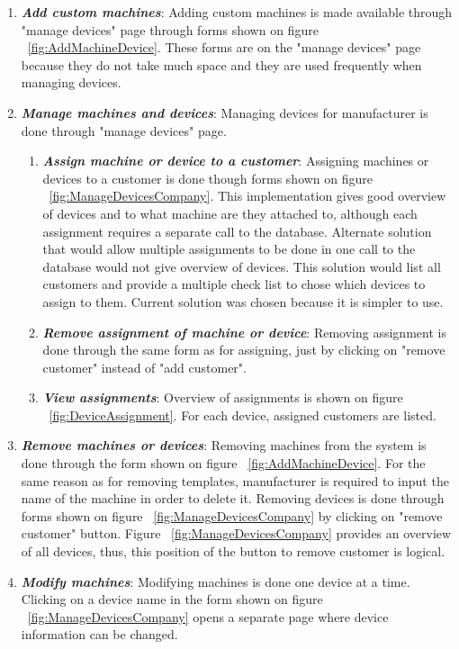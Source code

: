 \begin{enumerate}
	\item \textbf{\textit{Add custom machines}}: Adding custom machines is made available through "manage devices" page through forms shown on figure ~\ref{fig:AddMachineDevice}. These forms are on the "manage devices" page because they do not take much space and they are used frequently when managing devices.

	
	\item \textbf{\textit{Manage machines and devices}}: Managing devices for manufacturer is done through "manage devices" page.
		\begin{enumerate}
			\item \textbf{\textit{Assign machine or device to a customer}}: Assigning machines or devices to a customer is done though forms shown on figure ~\ref{fig:ManageDevicesCompany}. This implementation gives good overview of devices and to what machine are they attached to, although each assignment requires a separate call to the database. Alternate solution that would allow multiple assignments to be done in one call to the database would not give overview of devices. This solution would list all customers and provide a multiple check list to chose which devices to assign to them. Current solution was chosen because it is simpler to use.

			\item \textbf{\textit{Remove assignment of machine or device}}: Removing assignment is done through the same form as for assigning, just by clicking on "remove customer" instead of "add customer".

			\item \textbf{\textit{View assignments}}: Overview of assignments is shown on figure ~\ref{fig:DeviceAssignment}. For each device, assigned customers are listed.
		\end{enumerate}

	\item \textbf{\textit{Remove machines or devices}}: Removing machines from the system is done through the form shown on figure ~\ref{fig:AddMachineDevice}. For the same reason as for removing templates, manufacturer is required to input the name of the machine in order to delete it. Removing devices is done through forms shown on figure ~\ref{fig:ManageDevicesCompany} by clicking on "remove customer" button. Figure ~\ref{fig:ManageDevicesCompany} provides an overview of all devices, thus, this position of the button to remove customer is logical.

	\item \textbf{\textit{Modify machines}}: Modifying machines is done one device at a time. Clicking on a device name in the form shown on figure ~\ref{fig:ManageDevicesCompany} opens a separate page where device information can be changed. 

\end{enumerate}

